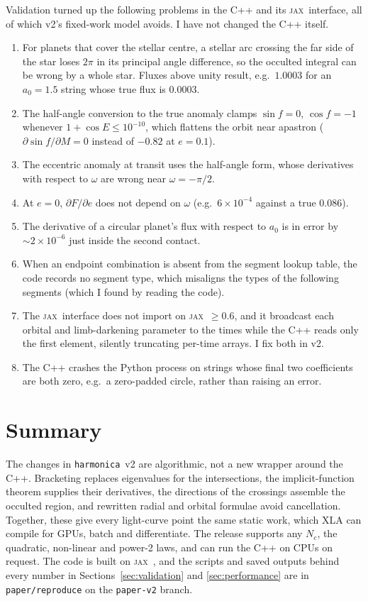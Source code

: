 \documentclass[twocolumn]{aastex701}
\newcommand{\harmonica}{\texttt{harmonica}}
\newcommand{\jax}{\textsc{jax}}
\begin{document}
Validation turned up the following problems in the C++ and its \jax\
interface, all of which v2's fixed-work model avoids. I have not changed
the C++ itself.
\begin{enumerate}
\item For planets that cover the stellar centre, a stellar arc crossing
the far side of the star loses $2\pi$ in its principal angle difference,
so the occulted integral can be wrong by a whole star. Fluxes above unity
result, e.g.\ $1.0003$ for an $a_0=1.5$ string whose true flux is
$0.0003$.
\item The half-angle conversion to the true anomaly clamps
$\sin f=0$, $\cos f=-1$ whenever $1+\cos E\leq10^{-10}$, which flattens
the orbit near apastron ($\partial\sin f/\partial M = 0$ instead of $-0.82$
at $e=0.1$).
\item The eccentric anomaly at transit uses the half-angle form, whose
derivatives with respect to $\omega$ are wrong near $\omega=-\pi/2$.
\item At $e=0$, $\partial F/\partial e$ does not depend on $\omega$
(e.g.\ $6\times10^{-4}$ against a true $0.086$).
\item The derivative of a circular planet's flux with respect to $a_0$
is in error by ${\sim}2\times10^{-6}$ just inside the second contact.
\item When an endpoint combination is absent from the segment lookup
table, the code records no segment type, which misaligns the types of
the following segments (which I found by reading the code).
\item The \jax\ interface does not import on \jax\ $\geq0.6$, and it
broadcast each orbital and limb-darkening parameter to the times while
the C++ reads only the first element, silently truncating per-time
arrays. I fix both in v2.
\item The C++ crashes the Python process on strings whose final two
coefficients are both zero, e.g.\ a zero-padded circle, rather than
raising an error.
\end{enumerate}

\section{Summary} \label{sec:summary}

The changes in \harmonica\ v2 are algorithmic, not a new wrapper around
the C++. Bracketing replaces eigenvalues for the intersections, the
implicit-function theorem supplies their derivatives, the directions of
the crossings assemble the occulted region, and rewritten radial and
orbital formulae avoid cancellation. Together, these give every
light-curve point the same static work, which XLA can compile for GPUs,
batch and differentiate. The release supports any $N_c$, the
quadratic, non-linear and power-2 laws, and can run the C++ on CPUs on
request. The code is built on \jax\ \citep{jax2018}, and the scripts and
saved outputs behind every number in Sections~\ref{sec:validation} and
\ref{sec:performance} are in \texttt{paper/reproduce} on the
\texttt{paper-v2} branch.
\end{document}

